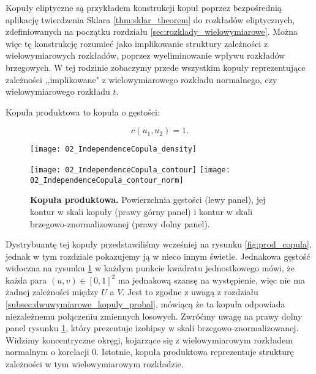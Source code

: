 Kopuły eliptyczne są przykładem konstrukcji kopuł poprzez bezpośrednią aplikację twierdzenia Sklara \ref{thm:sklar_theorem} do rozkładów eliptycznych, zdefiniowanych na początku rozdziału \ref{sec:rozklady_wielowymiarowe}. Można więc tę konstrukcję rozumieć jako implikowanie struktury zależności z wielowymiarowych rozkładów, poprzez wyeliminowanie wpływu rozkładów brzegowych. W tej rodzinie zobaczymy przede wszystkim kopuły reprezentujące zależności ,,implikowane" z wielowymiarowego rozkładu normalnego, czy wielowymiarowego rozkładu $t$.

\begin{df}
	Kopuła produktowa to kopuła o gęstości:
	
	$$ c(u_1, u_2) = 1.$$
	
\end{df}
\begin{figure}[h]
	\centering
	\begin{minipage}{0.5\linewidth}
		\texttt{[image: 02\_IndependenceCopula\_density]}
	\end{minipage}
	\begin{minipage}{0.45\linewidth}
		\texttt{[image: 02\_IndependenceCopula\_contour]}
		\texttt{[image: 02\_IndependenceCopula\_contour\_norm]}
	\end{minipage}
	\caption{\textbf{Kopuła produktowa.} Powierzchnia gęstości (lewy panel), jej kontur w skali kopuły (prawy górny panel) i kontur w skali brzegowo-znormalizowanej (prawy dolny panel). \label{fig:product_copula_density}}
\end{figure}

Dystrybuantę tej kopuły przedstawiliśmy wcześniej na rysunku \ref{fig:prod_copula}, jednak w tym rozdziale pokazujemy ją w nieco innym świetle. Jednakowa gęstość widoczna na rysunku \ref{fig:product_copula_density} w każdym punkcie kwadratu jednostkowego mówi, że każda para $(u, v) \in [0,1]^2$ ma jednakową szansę na występienie, więc nie ma żadnej zależności między $U$ a $V$. Jest to zgodne z uwagą z rozdziału \ref{subsec:dwuwymiarowe_kopuly_probal}, mówiącą że ta kopuła odpowiada niezależnemu połączeniu zmiennych losowych. Zwróćmy uwagę na prawy dolny panel rysunku \ref{fig:product_copula_density}, który prezentuje izohipsy w skali brzegowo-znormalizowanej. Widzimy koncentryczne okręgi, kojarzące się z wielowymiarowym rozkładem normalnym o korelacji $0$. Istotnie, kopuła produktowa reprezentuje strukturę zależności w tym wielowymiarowym rozkładzie.

